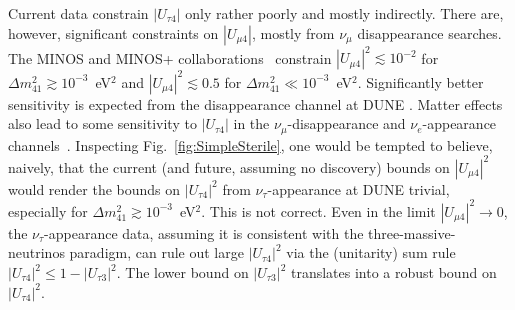 \documentclass[aps,prd,onecolumn,nofootinbib,superscriptaddress, 11pt]{revtex4}
\begin{document}
Current data constrain $|U_{\tau4}|$ only rather poorly and mostly indirectly. There are, however, significant constraints on $|U_{\mu 4}|$, mostly from $\nu_{\mu}$ disappearance searches. The MINOS and MINOS+ collaborations~\cite{Adamson:2017uda} constrain $|U_{\mu4}|^2\lesssim 10^{-2}$ for $\Delta m^2_{41}\gtrsim 10^{-3}$~eV$^2$ and $|U_{\mu4}|^2\lesssim 0.5$ for $\Delta m^2_{41}\ll10^{-3}$~eV$^2$. Significantly better sensitivity is expected from the disappearance channel at DUNE \cite{Berryman:2015nua,Gandhi:2015xza,Dutta:2016glq,Gupta:2018qsv}. Matter effects also lead to some sensitivity to $|U_{\tau 4}|$ in the $\nu_{\mu}$-disappearance and $\nu_e$-appearance channels~\cite{Abe:2014gda,Aartsen:2017bap,Blennow:2018hto}. Inspecting Fig.~\ref{fig:SimpleSterile}, one would be tempted to believe, naively, that the current (and future, assuming no discovery) bounds on $|U_{\mu4}|^2$ would render the bounds on $|U_{\tau 4}|^2$ from $\nu_{\tau}$-appearance at DUNE trivial,  especially for $\Delta m^2_{41}\gtrsim 10^{-3}$~eV$^2$. This is not correct. Even in the limit $|U_{\mu4}|^2\to 0$, the $\nu_{\tau}$-appearance data, assuming it is consistent with the three-massive-neutrinos paradigm, can rule out large $|U_{\tau4}|^2$ via the (unitarity) sum rule $|U_{\tau4}|^2\le 1-|U_{\tau3}|^2$. The lower bound on $|U_{\tau3}|^2$ translates into a robust bound on $|U_{\tau4}|^2$.
\end{document}
